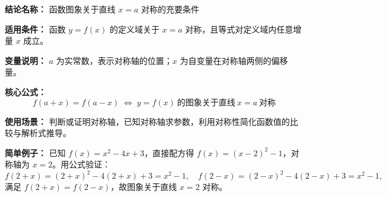 \textbf{结论名称：} 函数图象关于直线 \(x=a\) 对称的充要条件

\textbf{适用条件：} 函数 \(y=f(x)\) 的定义域关于 \(x=a\) 对称，且等式对定义域内任意增量 \(x\) 成立。

\textbf{变量说明：} \(a\) 为实常数，表示对称轴的位置；\(x\) 为自变量在对称轴两侧的偏移量。

\textbf{核心公式：}
\[
\boxed{f(a+x)=f(a-x) \;\Longleftrightarrow\; y=f(x)\ \text{的图象关于直线}\ x=a\ \text{对称}}
\]

\textbf{使用场景：} 判断或证明对称轴，已知对称轴求参数，利用对称性简化函数值的比较与解析式推导。

\textbf{简单例子：} 已知 \(f(x)=x^2-4x+3\)，直接配方得 \(f(x)=(x-2)^2-1\)，对称轴为 \(x=2\)。用公式验证：
\[
f(2+x)=(2+x)^2-4(2+x)+3=x^2-1,\quad f(2-x)=(2-x)^2-4(2-x)+3=x^2-1,
\]
满足 \(f(2+x)=f(2-x)\)，故图象关于直线 \(x=2\) 对称。